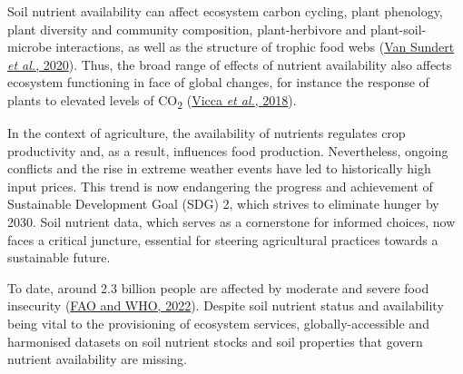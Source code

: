 \documentclass[
  10pt,
  b5paper,
  oneside]{book}
\begin{document}
Soil nutrient availability can affect ecosystem carbon cycling, plant phenology, plant diversity and community composition, plant-herbivore and plant-soil-microbe interactions, as well as the structure of trophic food webs (\protect\hyperlink{ref-vanSundert2020}{Van Sundert \emph{et al.}, 2020}). Thus, the broad range of effects of nutrient availability also affects ecosystem functioning in face of global changes, for instance the response of plants to elevated levels of CO\textsubscript{2} (\protect\hyperlink{ref-vicca2018}{Vicca \emph{et al.}, 2018}).

In the context of agriculture, the availability of nutrients regulates crop productivity and, as a result, influences food production. Nevertheless, ongoing conflicts and the rise in extreme weather events have led to historically high input prices. This trend is now endangering the progress and achievement of Sustainable Development Goal (SDG) 2, which strives to eliminate hunger by 2030. Soil nutrient data, which serves as a cornerstone for informed choices, now faces a critical juncture, essential for steering agricultural practices towards a sustainable future.

To date, around 2.3 billion people are affected by moderate and severe food insecurity (\protect\hyperlink{ref-FAO2022}{FAO and WHO, 2022}). Despite soil nutrient status and availability being vital to the provisioning of ecosystem services, globally-accessible and harmonised datasets on soil nutrient stocks and soil properties that govern nutrient availability are missing.
\end{document}
